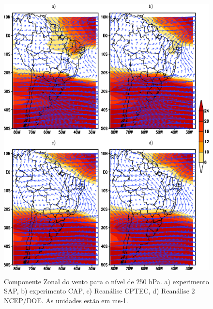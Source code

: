 \begin{figure}[!hbp]
\centering
\includegraphics[height=15cm]{./figs/media_vento-zonal_anl_250hPa.png}
\caption{Componente Zonal do vento para o nível de 250 hPa. a) experimento SAP, b) experimento CAP, c) Reanálise CPTEC, d) Reanálise 2 NCEP/DOE. As unidades estão em ms-1.}
\label{fig16}
\end{figure}

